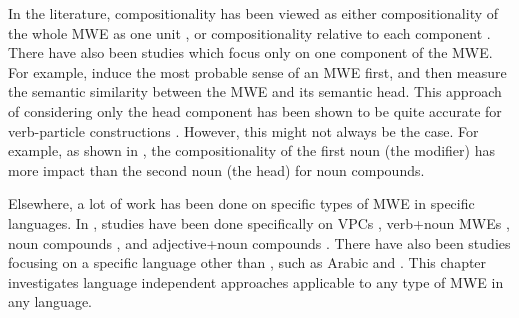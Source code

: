 \documentclass[output=paper,modfonts,nonflat]{langsci/langscibook}
\begin{document}
In the literature, compositionality has been viewed as either
compositionality of the whole MWE as one unit
\citep{mccarthy2003,venkatapathy2005,Katz06automaticidentification,Biemann2011,farahmand2015},
or compositionality relative to each component
\citep{reddy2011a,hermann2012,SchulteImWalde+:2013}.  There have also
been studies which focus only on one component of the MWE.  For
example, \cite{korkontzelos2009} induce the most probable sense of an
MWE first, and then measure the semantic similarity between the MWE
and its semantic head.  This approach of considering only the head
component has been shown to be quite accurate for  verb-particle 
constructions \citep{bannard2003}. However, this might not
always be the case.  For example, as shown in \cite{reddy2011a}, the
compositionality of the first noun (the modifier) has more impact than
the second noun (the head) for  noun compounds.

Elsewhere, a lot of work has been done on specific types of MWE in
specific languages.  In , studies have been done specifically
on VPCs \citep{mccarthy2003,bannard2003}, verb+noun MWEs
\citep{venkatapathy2005,mccarthy2007,fazly-cook-stevenson:2009:CL},
noun compounds \citep{reddy2011a}, and adjective+noun compounds
\citep{vecchi2011}.  There have also been studies focusing on a
specific language other than , such as Arabic \citep{saif2013}
and  \citep{SchulteImWalde+:2013}. This chapter investigates
language independent approaches applicable to any type of MWE in any
language.


\end{document}
